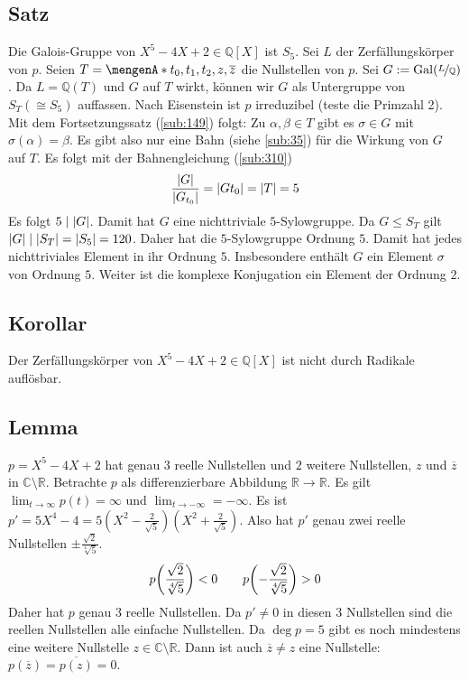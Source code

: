 \subsection[{Satz: Die Galois-Gruppe von $X^5- 4X+2 \in \mathds{Q}[X]$ ist $S_5$}]{Satz} %
\label{sub:227}
Die Galois-Gruppe von $X^5- 4X+2 \in \mathds{Q}[X]$ ist $S_5$.
Sei $L$ der Zerfällungskörper von $p$. Seien $T= \set{t_0, t_1, t_2, z, \overline{z} } $ die Nullstellen von $p$. Sei $G := \Gal(\nicefrac{L}{\mathds{Q}})$. Da $L=\mathds{Q}(T)$ und $G$ auf $T$ wirkt, können wir $G$ als Untergruppe von
$S_T (\cong S_5)$ auffassen. Nach Eisenstein ist $p$ irreduzibel (teste die Primzahl 2). Mit dem Fortsetzungssatz (\ref{sub:149}) folgt: Zu $\alpha, \beta \in T$ gibt es
$\sigma \in G$ mit $\sigma(\alpha)=\beta$. Es gibt also nur eine Bahn (siehe \ref{sub:35}) für die Wirkung von $G$ auf $T$. Es folgt mit der Bahnengleichung (\ref{sub:310})
\[
	\frac{\abs*{G} }{\abs*{G_{t_0}}} = \abs*{G t_0} = \abs*{T} = 5  
\]
Es folgt $5 \mid \abs*{G}$. Damit hat $G$ eine nichttriviale $5$-Sylowgruppe. Da $G \le S_T$ gilt $\abs*{G} \mid \abs*{S_T} = \abs*{S_5} = 120 $. Daher hat die $5$-Sylowgruppe
Ordnung $5$. Damit hat jedes nichttriviales Element in ihr Ordnung $5$. Insbesondere enthält $G$ ein Element $\sigma$ von Ordnung $5$. Weiter ist die komplexe Konjugation
ein Element der Ordnung $2$.

\subsection[{Korollar: Der Zerfällungskörper von $X^5-4X +2 \in \mathds{Q}[X]$}]{Korollar} %
\label{sub:228}
Der Zerfällungskörper von $X^5-4X +2 \in \mathds{Q}[X]$ ist nicht durch Radikale auflösbar.

\subsection[Lemma: Nullstellen von $X^5- 4X +2$]{Lemma} %
\label{sub:229}
$p=X^5-4X+2$ hat genau $3$ reelle Nullstellen und $2$ weitere Nullstellen, $z$ und $\overline{z} $ in $\mathds{C} \setminus \mathds{R}$.
Betrachte $p$ als differenzierbare Abbildung $\mathds{R} \to \mathds{R}$. Es gilt $\lim_{ t \to \infty}p(t) = \infty $ und $\lim_{ t \to -\infty} = - \infty $.
Es ist $p' = 5 X^4 -4 = 5 (X^2- \frac{2}{\sqrt{5}  } ) (X^2+ \frac{2}{\sqrt{5}})$. Also hat $p'$ genau zwei reelle Nullstellen $\pm \frac{\sqrt{2}  }{\sqrt[4]{5}}$.
\[
	p \enbrace*{\frac{\sqrt{2}  }{\sqrt[4]{5}  } } < 0 \qquad p \enbrace*{ - \frac{\sqrt{2}  }{\sqrt[4]{5}  } } >0
\]
Daher hat $p$ genau $3$ reelle Nullstellen. Da $p' \not= 0$ in diesen $3$ Nullstellen sind die reellen Nullstellen alle einfache Nullstellen. Da $\deg p =5$ gibt es noch
mindestens eine weitere Nullstelle $z \in \mathds{C} \setminus \mathds{R}$. Dann ist auch $\overline{z} \not= z $ eine Nullstelle: $p(\overline{z} ) = \overline{p(z)} =0.$
\bewende

